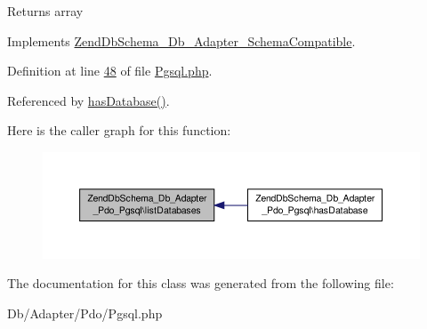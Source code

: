 \begin{DoxyReturn}{Returns}
array 
\end{DoxyReturn}


Implements \hyperlink{interfaceZendDbSchema__Db__Adapter__SchemaCompatible_a4c7951a6b329d2106502dbbaae82e51d}{Zend\-Db\-Schema\-\_\-\-Db\-\_\-\-Adapter\-\_\-\-Schema\-Compatible}.



Definition at line \hyperlink{Pgsql_8php_source_l00048}{48} of file \hyperlink{Pgsql_8php_source}{Pgsql.\-php}.



Referenced by \hyperlink{Pgsql_8php_source_l00038}{has\-Database()}.



Here is the caller graph for this function\-:\nopagebreak
\begin{figure}[H]
\begin{center}
\leavevmode
\includegraphics[width=350pt]{classZendDbSchema__Db__Adapter__Pdo__Pgsql_a869a9fd424bcb256dd16682c4b549ece_icgraph}
\end{center}
\end{figure}




The documentation for this class was generated from the following file\-:\begin{DoxyCompactItemize}
\item 
Db/\-Adapter/\-Pdo/Pgsql.\-php\end{DoxyCompactItemize}
